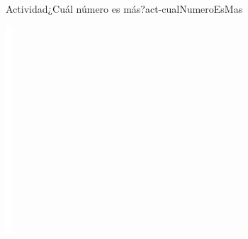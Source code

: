 \documentclass[20pt]{extarticle}
\begin{document}
\begin{activity}{Actividad}{¿Cuál número es más?}{act-cualNumeroEsMas}
\begin{image}{0}{1}{0}{}
\includegraphics[max width=\linewidth, center]{external/whitespace-tikz/5cm.pdf}

\end{image}
\end{activity}
\end{document}
